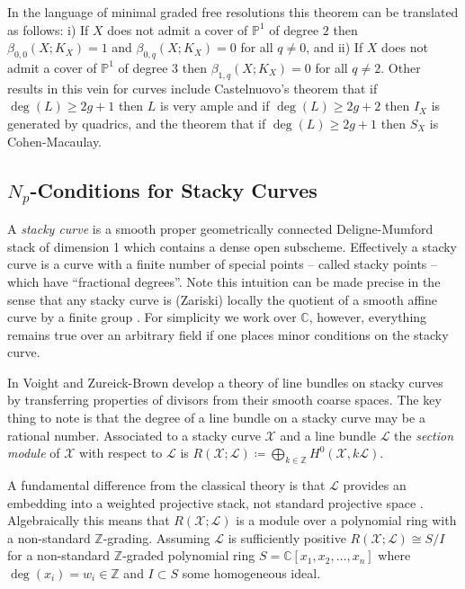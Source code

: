 \documentclass[11pt,reqno]{amsart}
\theoremstyle{remark}
\newcommand{\CC}{\mathbb{C}}
\newcommand{\PP}{\mathbb{P}}
\newcommand{\ZZ}{\mathbb{Z}}
\newcommand{\cL}{\mathcal{L}}
\newcommand{\cX}{\mathcal{X}}
\begin{document}
In the language of minimal graded free resolutions this theorem can be translated as follows:  i) If $X$ does not admit a cover of $\PP^{1}$ of degree $2$ then $\beta_{0,0}(X;K_X)=1$ and $\beta_{0,q}(X;K_X)=0$ for all $q\neq0$, and ii) If $X$ does not admit a cover of $\PP^{1}$ of degree $3$ then $\beta_{1,q}(X;K_X)=0$ for all $q\neq2$. Other results in this vein for curves include Castelnuovo's theorem that if $\deg(L)\geq 2g+1$ then $L$ is very ample and if $\deg(L)\geq 2g+2$ then $I_X$ is generated by quadrics, and the theorem that if $\deg(L)\geq 2g+1$ then $S_{X}$ is Cohen-Macaulay. 
 


\subsection{$N_{p}$-Conditions for Stacky Curves}


A \textit{stacky curve} is a smooth proper geometrically connected Deligne-Mumford stack of dimension 1 which contains a dense open subscheme. Effectively a stacky curve is a curve with a finite number of special points -- called stacky points -- which have ``fractional degrees''. Note this intuition can be made precise in the sense that any stacky curve is (Zariski) locally the quotient of a smooth affine curve by a finite group \cite[Lemma~5.3.10]{voightZurieckBrown22}. For simplicity we work over $\CC$, however, everything remains true over an arbitrary field if one places minor conditions on the stacky curve. 

In \cite{voightZurieckBrown22} Voight and Zureick-Brown develop a theory of line bundles on stacky curves by transferring properties of divisors from their smooth coarse spaces. The key thing to note is that the degree of a line bundle on a stacky curve may be a rational number. Associated to a stacky curve $\cX$ and a line bundle $\cL$ the \emph{section module} of $\cX$ with respect to $\cL$ is $R(\cX;\cL)\coloneqq \bigoplus_{k\in \ZZ}H^{0}(\cX,k\cL)$. 

A fundamental difference from the classical theory is that $\cL$ provides an embedding into a weighted projective stack, not standard projective space \cite{braggOlssonWebb24}. Algebraically this means that $R(\cX;\cL)$ is a module over a polynomial ring with a non-standard $\ZZ$-grading. Assuming $\cL$ is sufficiently positive $R(\cX;\cL) \cong S/I$ for a non-standard $\ZZ$-graded polynomial ring $S=\CC[x_{1},x_{2},\ldots,x_{n}]$ where $\deg(x_{i})=w_{i}\in\ZZ$ and $I\subset S$ some homogeneous ideal. 
\end{document}
